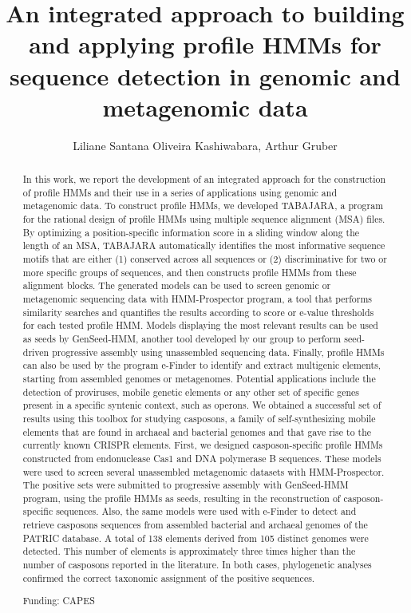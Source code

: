 \documentclass[twoside]{article}
\title{\vspace{-15mm}\fontsize{24pt}{10pt}\selectfont\textbf{ An integrated approach to building and applying profile HMMs for sequence detection in genomic and metagenomic data }} %
\author{ Liliane Santana Oliveira Kashiwabara, Arthur Gruber }
\affil{ USP }
\date{}
\begin{document}
  
  
  \maketitle %
  
  
  \thispagestyle{fancy} %
  
  
  \begin{abstract}
  In this work,  we report the development of an integrated approach for the construction of profile HMMs and their use in a series of applications using genomic and metagenomic data. To construct profile HMMs,  we developed TABAJARA,  a program for the rational design of profile HMMs using multiple sequence alignment (MSA) files. By optimizing a position-specific information score in a sliding window along the length of an MSA,  TABAJARA automatically identifies the most informative sequence motifs that are either (1) conserved across all sequences or (2) discriminative for two or more specific groups of sequences,  and then constructs profile HMMs from these alignment blocks. The generated models can be used to screen genomic or metagenomic sequencing data with HMM-Prospector program,  a tool that performs similarity searches and quantifies the results according to score or e-value thresholds for each tested profile HMM. Models displaying the most relevant results can be used as seeds by GenSeed-HMM,  another tool developed by our group to perform seed-driven progressive assembly using unassembled sequencing data. Finally,  profile HMMs can also be used by the program e-Finder to identify and extract multigenic elements,  starting from assembled genomes or metagenomes. Potential applications include the detection of proviruses,  mobile genetic elements or any other set of specific genes present in a specific syntenic context,  such as operons. We obtained a successful set of results using this toolbox for studying casposons,  a family of self-synthesizing mobile elements that are found in archaeal and bacterial genomes and that gave rise to the currently known CRISPR elements. First,  we designed casposon-specific profile HMMs constructed from endonuclease Cas1 and DNA polymerase B sequences. These models were used to screen several unassembled metagenomic datasets with HMM-Prospector. The positive sets were submitted to progressive assembly with GenSeed-HMM program,  using the profile HMMs as seeds,  resulting in the reconstruction of casposon-specific sequences. Also,  the same models were used with e-Finder to detect and retrieve casposons sequences from assembled bacterial and archaeal genomes of the PATRIC database. A total of 138 elements derived from 105 distinct genomes were detected. This number of elements is approximately three times higher than the number of casposons reported in the literature. In both cases,  phylogenetic analyses confirmed the correct taxonomic assignment of the positive sequences.
  
  Funding: CAPES \\ 
  \end{abstract}
  
\end{document}

